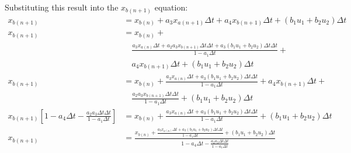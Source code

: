 \documentclass[11pt]{article}
\begin{document}
Substituting this result into the $x_{b(n+1)}$ equation:
\begin{subequations}
  \begin{align}
    x_{b(n+1)} &= x_{b(n)} +  a_3 x_{a(n+1)}\Delta t + a_4 x_{b(n+1)}\Delta t + (b_1 u_1 + b_2 u_2)\Delta t \\
    x_{b(n+1)} &= x_{b(n)} + \\ \nonumber
    &\quad \frac{a_3 x_{a(n)}\Delta t + a_2 a_3 x_{b(n+1)}\Delta t\Delta t + a_3(b_1 u_1 + b_2 u_2)\Delta t\Delta t}{1 - a_1\Delta t} + \\ \nonumber
    &\quad a_4 x_{b(n+1)}\Delta t + (b_1 u_1 + b_2 u_2)\Delta t \\
    x_{b(n+1)} &= x_{b(n)} + \frac{a_3 x_{a(n)}\Delta t + a_3(b_1 u_1 + b_2 u_2)\Delta t\Delta t}{1 - a_1\Delta t} + a_4 x_{b(n+1)}\Delta t + \\ \nonumber
    &\quad \frac{a_2 a_3 x_{b(n+1)}\Delta t\Delta t}{1 - a_1\Delta t} + (b_1 u_1 + b_2 u_2)\Delta t \\
    x_{b(n+1)}\left[1 - a_4\Delta t - \frac{a_2 a_3 \Delta t\Delta t}{1 - a_1\Delta t}\right] &= x_{b(n)} + \frac{a_3 x_{a(n)}\Delta t + a_3(b_1 u_1 + b_2 u_2)\Delta t\Delta t}{1 - a_1\Delta t} + (b_1 u_1 + b_2 u_2)\Delta t \\
    x_{b(n+1)} &= \frac{x_{b(n)} + \frac{a_3 x_{a(n)}\Delta t + a_3(b_1 u_1 + b_2 u_2)\Delta t\Delta t}{1 - a_1\Delta t} + (b_1 u_1 + b_2 u_2)\Delta t}{1 - a_4\Delta t - \frac{a_2 a_3 \Delta t\Delta t}{1 - a_1\Delta t}}
  \end{align}
\end{subequations}
\end{document}

